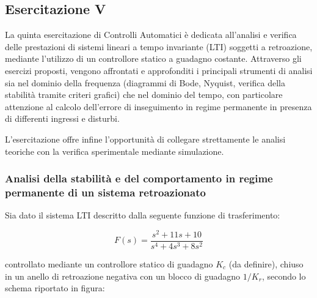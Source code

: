 \documentclass[../main.tex]{subfiles}
\begin{document}
\clearpage
\thispagestyle{empty}
\subsection{Esercitazione V}

La quinta esercitazione di Controlli Automatici è dedicata all’analisi e verifica delle prestazioni di sistemi lineari a tempo invariante (LTI) soggetti a retroazione, mediante l’utilizzo di un controllore statico a guadagno costante. Attraverso gli esercizi proposti, vengono affrontati e approfonditi i principali strumenti di analisi sia nel dominio della frequenza (diagrammi di Bode, Nyquist, verifica della stabilità tramite criteri grafici) che nel dominio del tempo, con particolare attenzione al calcolo dell’errore di inseguimento in regime permanente in presenza di differenti ingressi e disturbi.

L’esercitazione offre infine l’opportunità di collegare strettamente le analisi teoriche con la verifica sperimentale mediante simulazione.

\vspace*{1cm}
\subsubsection{Analisi della stabilità e del comportamento in regime permanente di un sistema retroazionato}
\label{lab51}

Sia dato il sistema LTI descritto dalla seguente funzione di trasferimento:

\begin{equation}
	F(s) = \frac{s^2 + 11s + 10}{s^4 + 4s^3 + 8s^2}
\end{equation}

controllato mediante un controllore statico di guadagno $K_c$ (da definire), chiuso in un anello di retroazione negativa con un blocco di guadagno $1/K_r$, secondo lo schema riportato in figura:
\end{document}
